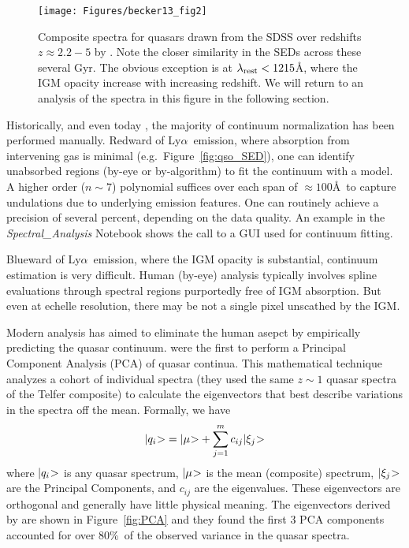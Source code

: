 \documentclass[graybox]{svmult}
\def\lya{Ly$\alpha$}
\def\ket#1{{|#1\negmedspace>}}
\def\smm{\sum\limits}
\begin{document}
%
\begin{figure}[b]
\sidecaption
\texttt{[image: Figures/becker13\_fig2]}
%
%
\caption{Composite spectra for quasars drawn
from the SDSS over redshifts $z \approx 2.2-5$
by \cite{becker+13}.  Note the closer similarity
in the SEDs across these several Gyr.  The obvious
exception is at $\lambda_{\rm rest} < 1215$\AA, where
the IGM opacity increase with increasing redshift. 
We will return to an analysis of the spectra in this
figure in the following section.
}
\label{fig:becker13_fig2}       %
\end{figure}

Historically, and even today \cite[e.g.]{kodiaq_dr2}, the majority of 
continuum normalization has been performed manually.  Redward
of \lya\ emission, where absorption from intervening gas is
minimal (e.g.\ Figure~\ref{fig:qso_SED}), one can identify
unabsorbed regions (by-eye or by-algorithm) to fit the
continuum with a model.  A higher order ($n \sim 7$)
polynomial suffices over each span of $\approx 100$\AA\ to
capture undulations due to underlying emission features.
One can routinely achieve a precision of several percent,
depending on the data quality.  An example in the 
{\it Spectral\_Analysis} Notebook shows the call to a 
GUI used for continuum fitting.

Blueward of \lya\ emission, where the IGM opacity is
substantial, continuum estimation is very difficult.
Human (by-eye) analysis typically involves spline evaluations
through spectral regions purportedly free of IGM absorption.
But even at echelle resolution, there may be not a single
pixel unscathed by the IGM.

Modern analysis has aimed to eliminate the human asepct
by empirically predicting the quasar continuum.  
\cite{suzuki06} were the first to perform a Principal
Component Analysis (PCA) of quasar continua.  This 
mathematical technique analyzes a cohort of individual
spectra (they used the same $z \sim 1$ quasar spectra
of the Telfer composite) to calculate the eigenvectors
that best describe variations in the spectra off the mean.
Formally, we have
\begin{equation}
\ket{q_i} = \ket{\mu} + \smm_{j=1}^{m} c_{ij} \ket{\xi_j}
\label{eqn:PCA}
\end{equation}
where $\ket{q_i}$ is any quasar spectrum,
$\ket{\mu}$ is the mean (composite) spectrum,
$\ket{\xi_j}$ are the Principal Components, and
$c_{ij}$ are the eigenvalues.
These eigenvectors are orthogonal and generally
have little physical meaning.  The eigenvectors
derived by \cite{susuki06}
are shown in Figure~\ref{fig:PCA} and they found
the first 3 PCA components accounted for over
80\%\ of the observed variance in the quasar spectra.
\end{document}
